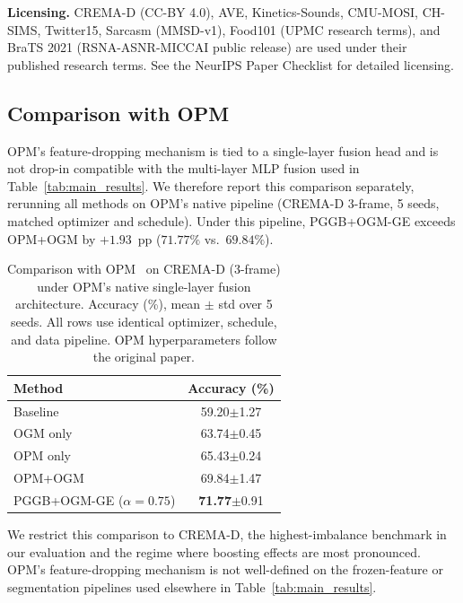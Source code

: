 \documentclass{article}
\begin{document}
\noindent\textbf{Licensing.} CREMA-D (CC-BY 4.0), AVE, Kinetics-Sounds, CMU-MOSI, CH-SIMS, Twitter15, Sarcasm (MMSD-v1), Food101 (UPMC research terms), and BraTS 2021 (RSNA-ASNR-MICCAI public release) are used under their published research terms. See the NeurIPS Paper Checklist for detailed licensing.

\subsection{Comparison with OPM}
\label{app:opm_comparison}

OPM's feature-dropping mechanism is tied to a single-layer fusion head and is not drop-in compatible with the multi-layer MLP fusion used in Table~\ref{tab:main_results}. We therefore report this comparison separately, rerunning all methods on OPM's native pipeline (CREMA-D 3-frame, 5 seeds, matched optimizer and schedule). Under this pipeline, PGGB+OGM-GE exceeds OPM+OGM by $+1.93$~pp ($71.77\%$ vs.\ $69.84\%$).

\begin{table}[H]
\centering
\caption{Comparison with OPM~\citep{wei2024opm} on CREMA-D (3-frame) under OPM's native single-layer fusion architecture. Accuracy (\%), mean $\pm$ std over 5 seeds. All rows use identical optimizer, schedule, and data pipeline. OPM hyperparameters follow the original paper.}
\label{tab:opm}
\vspace{0.5em}
\begin{tabular}{lc}
\toprule
\textbf{Method} & \textbf{Accuracy (\%)} \\
\midrule
Baseline               & 59.20{\scriptsize$\pm$1.27} \\
OGM only               & 63.74{\scriptsize$\pm$0.45} \\
OPM only               & 65.43{\scriptsize$\pm$0.24} \\
OPM+OGM                & 69.84{\scriptsize$\pm$1.47} \\
PGGB+OGM-GE ($\alpha{=}0.75$) & \textbf{71.77}{\scriptsize$\pm$0.91} \\
\bottomrule
\end{tabular}
\end{table}

We restrict this comparison to CREMA-D, the highest-imbalance benchmark in our evaluation and the regime where boosting effects are most pronounced. OPM's feature-dropping mechanism is not well-defined on the frozen-feature or segmentation pipelines used elsewhere in Table~\ref{tab:main_results}.
\end{document}
